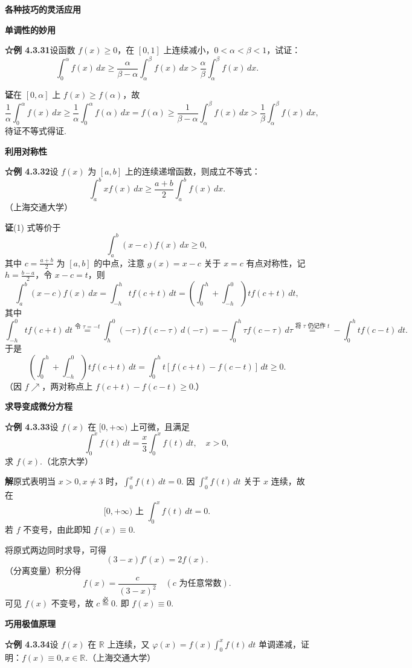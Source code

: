 \documentclass[UTF8,12pt,a4paper,fontset=fandol]{ctexart}
\begin{document}
\noindent\textbf{各种技巧的灵活应用}

\noindent\textbf{单调性的妙用}

\noindent\textbf{☆例 4.3.31}\quad 设函数 $f(x)\ge0$，在 $[0,1]$ 上连续减小，$0<\alpha<\beta<1$，试证：
\[
\int_0^\alpha f(x)\,dx
\ge\frac{\alpha}{\beta-\alpha}\int_\alpha^\beta f(x)\,dx
>\frac{\alpha}{\beta}\int_\alpha^\beta f(x)\,dx.
\]

\noindent\textbf{证}\quad 在 $[0,\alpha]$ 上 $f(x)\ge f(\alpha)$，故
\[
\frac1\alpha\int_0^\alpha f(x)\,dx
\ge\frac1\alpha\int_0^\alpha f(\alpha)\,dx
=f(\alpha)
\ge\frac1{\beta-\alpha}\int_\alpha^\beta f(x)\,dx
>\frac1\beta\int_\alpha^\beta f(x)\,dx,
\]
待证不等式得证.

\noindent\textbf{利用对称性}

\noindent\textbf{☆例 4.3.32}\quad 设 $f(x)$ 为 $[a,b]$ 上的连续递增函数，则成立不等式：
\[
\int_a^b xf(x)\,dx
\ge\frac{a+b}{2}\int_a^b f(x)\,dx.
\tag{1}
\]
（上海交通大学）

\noindent\textbf{证}\quad (1) 式等价于
\[
\int_a^b(x-c)f(x)\,dx\ge0,
\tag{2}
\]
其中 $c=\frac{a+b}{2}$ 为 $[a,b]$ 的中点，注意 $g(x)=x-c$ 关于 $x=c$ 有点对称性，记 $h=\frac{b-a}{2}$，令 $x-c=t$，则
\[
\int_a^b(x-c)f(x)\,dx
=\int_{-h}^h t f(c+t)\,dt
=\left(\int_0^h+\int_{-h}^0\right) t f(c+t)\,dt,
\tag{3}
\]
其中
\[
\int_{-h}^0 t f(c+t)\,dt
\overset{\text{令 }\tau=-t}{=}
\int_h^0(-\tau)f(c-\tau)\,d(-\tau)
=-\int_0^h\tau f(c-\tau)\,d\tau
\overset{\text{将 }\tau\text{ 仍记作 }t}{=}
-\int_0^h t f(c-t)\,dt.
\]
于是
\[
\left(\int_0^h+\int_{-h}^0\right)t f(c+t)\,dt
=\int_0^h t[f(c+t)-f(c-t)]\,dt\ge0.
\]
（因 $f\nearrow$，两对称点上 $f(c+t)-f(c-t)\ge0$.）

\noindent\textbf{求导变成微分方程}

\noindent\textbf{☆例 4.3.33}\quad 设 $f(x)$ 在 $[0,+\infty)$ 上可微，且满足
\[
\int_0^x f(t)\,dt=\frac{x}{3}\int_0^x f(t)\,dt,\quad x>0,
\]
求 $f(x)$.（北京大学）

\noindent\textbf{解}\quad 原式表明当 $x>0,x\ne3$ 时，$\int_0^x f(t)\,dt=0$. 因 $\int_0^x f(t)\,dt$ 关于 $x$ 连续，故在
\[
[0,+\infty)\text{ 上 }\int_0^x f(t)\,dt=0.
\]
若 $f$ 不变号，由此即知 $f(x)\equiv0$.

将原式两边同时求导，可得
\[
(3-x)f'(x)=2f(x).
\]
（分离变量）积分得
\[
f(x)=\frac{c}{(3-x)^2}\quad(c\text{ 为任意常数}).
\]
可见 $f(x)$ 不变号，故 $c\stackrel{\text{必}}{=}0$. 即 $f(x)\equiv0$.

\noindent\textbf{巧用极值原理}

\noindent\textbf{☆例 4.3.34}\quad 设 $f(x)$ 在 $\mathbb{R}$ 上连续，又 $\varphi(x)=f(x)\int_0^x f(t)\,dt$ 单调递减，证明：$f(x)\equiv0,x\in\mathbb{R}$.（上海交通大学）
\end{document}
